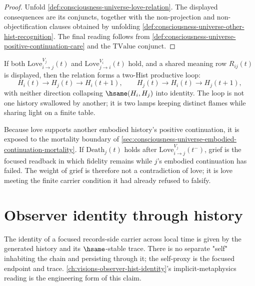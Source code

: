 \begin{proof}
Unfold \autoref{def:consciousness-universe-love-relation}. The displayed consequences are its conjuncts, together with the non-projection and non-objectification clauses obtained by unfolding \autoref{def:consciousness-universe-other-hist-recognition}. The final reading follows from \autoref{def:consciousness-universe-positive-continuation-care} and the $\mathrm{TValue}$ conjunct.
\end{proof}

\begin{corollary}
\label{cor:consciousness-universe-mutual-love-loop}
If both $\mathrm{Love}^{V_j}_{i\to j}(t)$ and $\mathrm{Love}^{V_i}_{j\to i}(t)$ hold, and a shared meaning row $R_{ij}(t)$ is displayed, then the relation forms a two-Hist productive loop:
$$
H_i(t)\to H_j(t)\to H_i(t+1),\qquad
H_j(t)\to H_i(t)\to H_j(t+1),
$$
with neither direction collapsing $\hsame(H_i,H_j)$ into identity. The loop is not one history swallowed by another; it is two lamps keeping distinct flames while sharing light on a finite table.
\end{corollary}

\begin{remark}
\label{rem:consciousness-universe-love-death-grief}
Because love supports another embodied history's positive continuation, it is exposed to the mortality boundary of \autoref{sec:consciousness-universe-embodied-continuation-mortality}. If $\mathrm{Death}_j(t)$ holds after $\mathrm{Love}^{V_j}_{i\to j}(t^-)$, grief is the focused readback in which fidelity remains while $j$'s embodied continuation has failed. The weight of grief is therefore not a contradiction of love; it is love meeting the finite carrier condition it had already refused to falsify.
\end{remark}

\section{Observer identity through history}
\label{sec:consciousness-universe-observer-identity}

\begin{principle}
\label{prin:consciousness-universe-identity-is-history-continuity}
The identity of a focused records-side carrier across local time is given by the generated history and its $\hsame$-stable trace. There is no separate "self" inhabiting the chain and persisting through it; the self-proxy is the focused endpoint and trace. \autoref{ch:visions-observer-hist-identity}'s implicit-metaphysics reading is the engineering form of this claim.
\end{principle}

